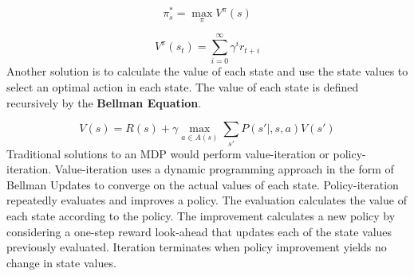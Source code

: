 \documentclass[10pt,journal,compsoc]{IEEEtran}
\begin{document}
\begin{equation}
\label{optimal_policy}
\pi_s^* = \max_\pi V^\pi(s)
\end{equation}

\begin{equation}
\label{state_value_accoridng_to_policy}
V^\pi(s_t) = \sum\limits_{i=0}^{\infty} \gamma^i r_{t+i}
\end{equation}
Another solution is to calculate the value of each state and use the state values to select an optimal action in each state. The value of each state is defined recursively by the \textbf{Bellman Equation}.

\begin{equation}
\label{bellman_state_utility}
V(s) = R(s) + \gamma\max_{a\in A(s)}\sum\limits_{s'} P(s'|,s,a)V(s')
\end{equation}
Traditional solutions to an MDP would perform value-iteration or policy-iteration. Value-iteration uses a dynamic programming approach in the form of Bellman Updates to converge on the actual values of each state. Policy-iteration repeatedly evaluates and improves a policy. The evaluation calculates the value of each state according to the policy. The improvement calculates a new policy by considering a one-step reward look-ahead that updates each of the state values previously evaluated. Iteration terminates when policy improvement yields no change in state values.
\end{document}
